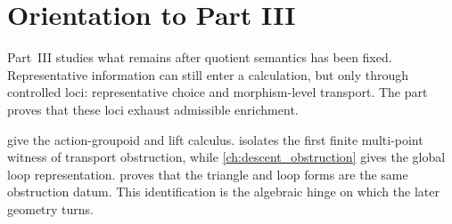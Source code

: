 \chapter*{Orientation to Part III}
\label{part:intro-transport}
\begin{chapterorientation}
\end{chapterorientation}

Part~III studies what remains after quotient semantics has been fixed.
Representative information can still enter a calculation, but only
through controlled loci: representative choice and morphism-level
transport.  The part proves that these loci exhaust admissible
enrichment.

 give the action-groupoid and lift calculus.
 isolates the first finite multi-point witness of
transport obstruction, while \cref{ch:descent_obstruction} gives the
global loop representation.   proves that the triangle
and loop forms are the same obstruction datum.  This identification is
the algebraic hinge on which the later geometry turns.
